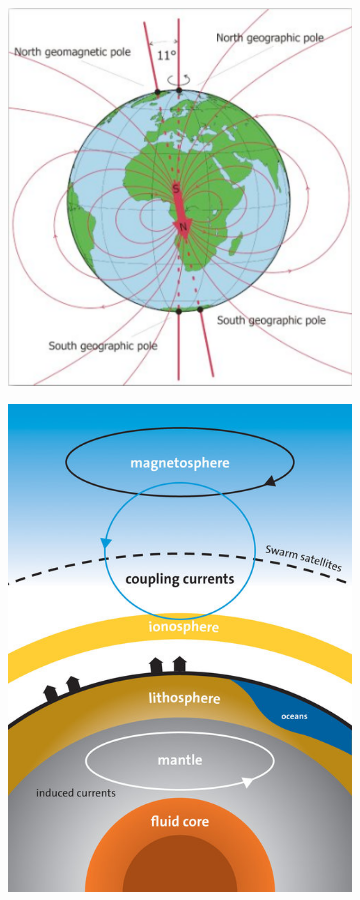 \begin{figure}[ht]
\begin{subfigure}[t]{0.3\textwidth}
		\includegraphics[width=.9\linewidth]{bilder/L3_earth_four_2.png}
		\caption{}\label{fig:L3_contributor2}
    \end{subfigure}
    \begin{subfigure}[t]{0.3\textwidth}
		\centering
		\includegraphics[width=.9\linewidth]{bilder/L3_earth_four_3.jpg}
		\caption{}\label{fig:L3_contributor3}
	\end{subfigure}


\end{figure}
